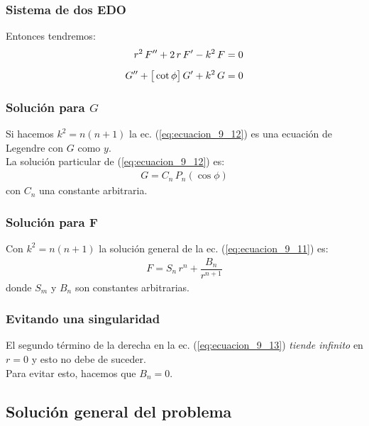 \documentclass[12pt]{beamer}
\begin{document}
\begin{frame}
\frametitle{Sistema de dos EDO}
Entonces tendremos:
\begin{align}
r^{2} \, {F}^{\prime \prime} + 2 \, r \, {F}^{\prime} - k^{2} \, F &= 0 \label{eq:ecuacion_9_11} \\[0.5em]
{G}^{\prime \prime} + \big[ \cot \phi \big] \, {G}^{\prime} + k^{2} \, G &= 0 \label{eq:ecuacion_9_12}
\end{align}
\end{frame}
\begin{frame}
\frametitle{Solución para $G$}
Si hacemos $k^{2} = n(n + 1)$ la ec. (\ref{eq:ecuacion_9_12}) es una ecuación de Legendre con $G$ como $y$.
\\
\bigskip
\pause
La solución particular de (\ref{eq:ecuacion_9_12}) es:
\pause
\begin{align*}
G = C_{n} \, P_{n}(\cos \phi)
\end{align*}
con $C_{n}$ una constante arbitraria.
\end{frame}
\begin{frame}
\frametitle{Solución para F}
Con $k^{2} = n(n + 1)$ la solución general de la ec. (\ref{eq:ecuacion_9_11}) es:
\pause
\begin{align}
F = S_{n} \, r^{n} + \dfrac{B_{n}}{r^{n+1}}
\label{eq:ecuacion_9_13}
\end{align}
donde $S_{m}$ y $B_{n}$ son constantes arbitrarias.
\end{frame}
\begin{frame}
\frametitle{Evitando una singularidad}
El segundo término de la derecha en la ec. (\ref{eq:ecuacion_9_13}) \emph{tiende infinito} en $r = 0$ y esto no debe de suceder.
\\
\bigskip
\pause
Para evitar esto, hacemos que $B_{n} = 0$.
\end{frame}

\subsection{Solución general del problema}
\end{document}
